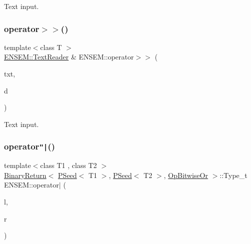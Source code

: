 Text input. 

\mbox{\label{group__primseed_ga1ab70381c53bf81dbfeced414a44a1d5}} 
\subsubsection{\texorpdfstring{operator$>$$>$()}{operator>>()}\hspace{0.1cm}{\footnotesize\ttfamily [2/2]}}
{\footnotesize\ttfamily template$<$class T $>$ \\
\mbox{\hyperlink{classENSEM_1_1TextReader}{E\+N\+S\+E\+M\+::\+Text\+Reader}} \& E\+N\+S\+E\+M\+::operator$>$$>$ (\begin{DoxyParamCaption}\item[{\mbox{\hyperlink{classENSEM_1_1TextReader}{E\+N\+S\+E\+M\+::\+Text\+Reader}} \&}]{txt,  }\item[{\mbox{\hyperlink{classENSEM_1_1PSeed}{P\+Seed}}$<$ T $>$ \&}]{d }\end{DoxyParamCaption})\hspace{0.3cm}{\ttfamily [inline]}}



Text input. 

\mbox{\label{group__primseed_gafffac24485a71eb45df5a8073ab12746}} 
\subsubsection{\texorpdfstring{operator\texttt{"|}()}{operator|()}\hspace{0.1cm}{\footnotesize\ttfamily [1/2]}}
{\footnotesize\ttfamily template$<$class T1 , class T2 $>$ \\
\mbox{\hyperlink{structENSEM_1_1BinaryReturn}{Binary\+Return}}$<$ \mbox{\hyperlink{classENSEM_1_1PSeed}{P\+Seed}}$<$ T1 $>$, \mbox{\hyperlink{classENSEM_1_1PSeed}{P\+Seed}}$<$ T2 $>$, \mbox{\hyperlink{structENSEM_1_1OpBitwiseOr}{Op\+Bitwise\+Or}} $>$\+::Type\+\_\+t E\+N\+S\+E\+M\+::operator$\vert$ (\begin{DoxyParamCaption}\item[{const \mbox{\hyperlink{classENSEM_1_1PSeed}{P\+Seed}}$<$ T1 $>$ \&}]{l,  }\item[{const \mbox{\hyperlink{classENSEM_1_1PSeed}{P\+Seed}}$<$ T2 $>$ \&}]{r }\end{DoxyParamCaption})\hspace{0.3cm}{\ttfamily [inline]}}

